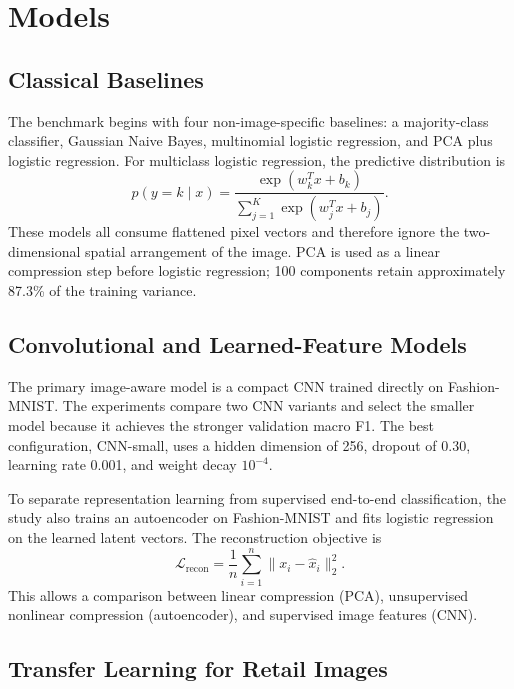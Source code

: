 \documentclass[11pt]{article}
\begin{document}
\section{Models}

\subsection{Classical Baselines}

The benchmark begins with four non-image-specific baselines: a majority-class classifier, Gaussian Naive Bayes, multinomial logistic regression, and PCA plus logistic regression. For multiclass logistic regression, the predictive distribution is
\begin{equation}
p(y = k \mid x) = \frac{\exp(w_k^T x + b_k)}{\sum_{j=1}^{K} \exp(w_j^T x + b_j)}.
\end{equation}
These models all consume flattened pixel vectors and therefore ignore the two-dimensional spatial arrangement of the image. PCA is used as a linear compression step before logistic regression; 100 components retain approximately 87.3\% of the training variance.

\subsection{Convolutional and Learned-Feature Models}

The primary image-aware model is a compact CNN trained directly on Fashion-MNIST. The experiments compare two CNN variants and select the smaller model because it achieves the stronger validation macro F1. The best configuration, CNN-small, uses a hidden dimension of 256, dropout of 0.30, learning rate 0.001, and weight decay $10^{-4}$.

To separate representation learning from supervised end-to-end classification, the study also trains an autoencoder on Fashion-MNIST and fits logistic regression on the learned latent vectors. The reconstruction objective is
\begin{equation}
\mathcal{L}_{\mathrm{recon}} = \frac{1}{n} \sum_{i=1}^{n} \|x_i - \hat{x}_i\|_2^2.
\end{equation}
This allows a comparison between linear compression (PCA), unsupervised nonlinear compression (autoencoder), and supervised image features (CNN).

\subsection{Transfer Learning for Retail Images}
\end{document}
